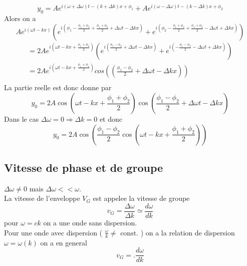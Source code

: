 \documentclass[../main.tex]{subfiles}
\begin{document}
\[ 
	y_0 = A e^{i( \omega + \Delta \omega) t - ( k + \Delta k)x + \phi_1}  + A e^{i( \omega - \Delta \omega) t - ( k - \Delta k)x + \phi_2} 
\]
Alors on a
\[ 
	A e^{i( \omega t - kx) } (  e^{i ( \phi_1 - \frac{\phi_1+\phi_2}{2 } + \frac{\phi_1+\phi_2}{2 } + \Delta \omega t - \Delta k x) } + e^{i ( \phi_2 - \frac{\phi_1+\phi_2}{2 } + \frac{\phi_1+\phi_2}{2 } - \Delta \omega t + \Delta k x) }  ) 
\]
\begin{align*}
	= 2A e^{i( \omega t - kx + \frac{\phi_1 + \phi_2}{2}) } ( e^{i ( \frac{\phi_1 - \phi_2}{2}+ \Delta \omega t - \Delta k x) } + e^{i ( -\frac{\phi_1 - \phi_2}{2}- \Delta \omega t + \Delta k x) }) \\
	=2A e^{i( \omega t - kx + \frac{\phi_1 + \phi_2}{2}) } cos( ( \frac{\phi_1 - \phi_2}{2}+ \Delta \omega t - \Delta k x) ) \\
\end{align*}
La partie reelle est donc donne par 
\[ 
	y_0 = 2 A \cos (  \omega t - kx + \frac{\phi_1 + \phi_2}{2})\cos (  \frac{\phi_1 - \phi_2}{2}+ \Delta \omega t - \Delta k x)  
\]
Dans le cas $\Delta \omega =0 \Rightarrow \Delta k = 0$ et donc
\[ 
	y_0 = 2A \cos (\frac{\phi_1-\phi_2}{2}\cos( \omega t -kx + \frac{\phi_1 + \phi_2}{2})  ) 
\]
\subsection{Vitesse de phase et de groupe}
$\Delta \omega \neq 0$ mais $\Delta \omega << \omega$.\\
La vitesse de l'enveloppe $V_G$ est appelee la vitesse de groupe
\[ 
v_G = \frac{\Delta \omega }{\Delta k} \simeq \frac{d\omega}{d k}
\]
pour $\omega= ck$ on a une onde sans dispersion.\\
Pour une onde avec dispersion  ( $\frac{\omega}{k} \neq \text{ const. } $) on a la relation de dispersion $\omega = \omega( k) $ on a en general
\[ 
v_G = .\frac{d\omega}{dk}
\]
\end{document}
